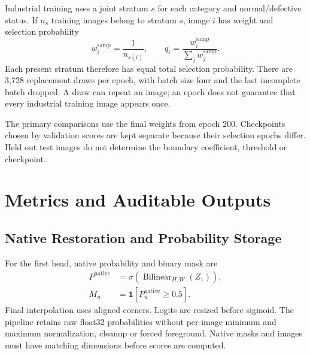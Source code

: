\documentclass[conference,letterpaper]{IEEEtran}
\begin{document}
Industrial training uses a joint stratum $s$ for each category and normal/defective status. If $n_s$ training images belong to stratum $s$, image $i$ has weight and selection probability
\begin{equation}
 w_i^{\mathrm{samp}}=\frac1{n_{s(i)}},
 \qquad q_i=\frac{w_i^{\mathrm{samp}}}{\sum_jw_j^{\mathrm{samp}}}.
 \label{eq:sampling}
\end{equation}
Each present stratum therefore has equal total selection probability. There are 3,728 replacement draws per epoch, with batch size four and the last incomplete batch dropped. A draw can repeat an image; an epoch does not guarantee that every industrial training image appears once.

The primary comparisons use the final weights from epoch 200. Checkpoints chosen by validation scores are kept separate because their selection epochs differ. Held out test images do not determine the boundary coefficient, threshold or checkpoint.

\section{Metrics and Auditable Outputs}
\label{sec:metrics}
\subsection{Native Restoration and Probability Storage}
For the first head, native probability and binary mask are
\begin{equation}
\begin{aligned}
 P^{\mathrm{native}}
 &=\sigma\!\left(\operatorname{Bilinear}_{H,W}(Z_1)\right),\\
 M_u&=\mathbf1[P^{\mathrm{native}}_u\geq0.5].
\end{aligned}
\label{eq:native}
\end{equation}
Final interpolation uses aligned corners. Logits are resized before sigmoid. The pipeline retains raw float32 probabilities without per-image minimum and maximum normalization, cleanup or forced foreground. Native masks and images must have matching dimensions before scores are computed.
\end{document}
